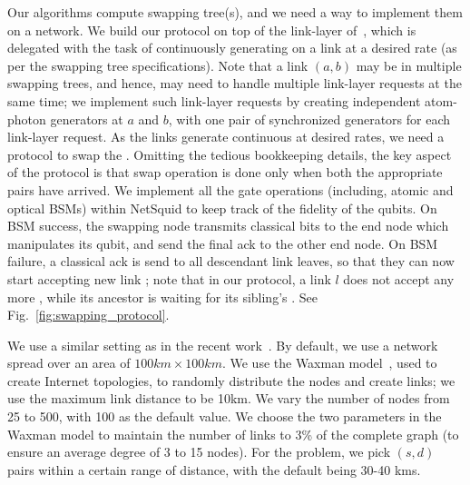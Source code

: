 Our algorithms compute swapping tree(s), and we need a way to implement them on a network. 
We build our protocol on top of the link-layer of~\cite{sigcomm19},
which is delegated with the task of continuously generating \epss on a link at a desired rate (as per the swapping tree specifications).
Note that a link $(a,b)$ may be in multiple swapping trees, and hence, may need to handle multiple link-layer requests 
at the same time; we implement such link-layer requests by creating independent atom-photon generators at $a$ and $b$, 
with one pair of synchronized generators for each link-layer request. 
As the links generate continuous \epss at desired rates, we need a protocol to
swap the \epss. Omitting the tedious bookkeeping details, the key aspect of the protocol
is that swap operation is done only when both the appropriate \eps pairs have arrived.
We implement all the gate operations (including, atomic and optical BSMs) within 
NetSquid to keep track of the fidelity of the qubits. 
On BSM success, the swapping node transmits classical bits to the end node which manipulates its qubit, and send the final ack to the other end node. 
On BSM failure, a classical ack is send to all descendant link leaves, so that they can now start accepting new link \epss; note that in our protocol, a link $l$ does not 
accept any more \epss, while its ancestor is waiting for its sibling's \eps. See Fig.~\ref{fig:swapping_protocol}.


We use a similar setting as in the recent work~\cite{sigcomm20}.
By default, we use a network spread over an area of $100 km \times 100 km$.
We use the Waxman model~\cite{waxman}, used to create Internet topologies,
to randomly distribute the nodes and create links; we use the maximum link
distance to be 10km. We vary the number of nodes from 25 to 
500, with 100
as the default value. We choose the two parameters in the Waxman model to
maintain the number of links to 3\% of the complete graph (to ensure an 
average degree of 3 to 15 nodes).
For the \spp problem, we pick $(s,d)$ pairs within a certain range of
distance, with the default being 30-40 kms.




